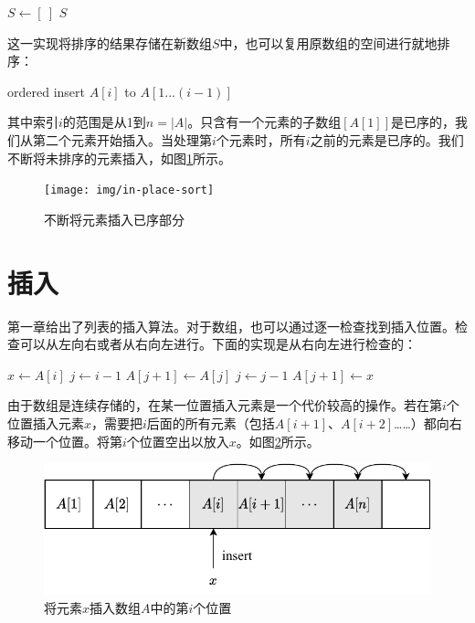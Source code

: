 \documentclass[b5paper]{ctexart}
\begin{document}
\begin{algorithmic}[1]
  \State $S \gets [\ ]$
    \State {}
  \EndFor
  \State \Return $S$
\EndFunction
\end{algorithmic}

这一实现将排序的结果存储在新数组$S$中，也可以复用原数组的空间进行就地排序：

\begin{algorithmic}[1]
    \State ordered insert $A[i]$ to $A[1...(i-1)]$
  \EndFor
\EndFunction
\end{algorithmic}

其中索引$i$的范围是从1到$n = |A|$。只含有一个元素的子数组$[A[1]]$是已序的，我们从第二个元素开始插入。当处理第$i$个元素时，所有$i$之前的元素是已序的。我们不断将未排序的元素插入，如图\ref{fig:in-place-isort}所示。

\begin{figure}[htbp]
  \centering
  \texttt{[image: img/in-place-sort]}
  \caption{不断将元素插入已序部分}
  \label{fig:in-place-isort}
\end{figure}

\section{插入}

第一章给出了列表的插入算法。对于数组，也可以通过逐一检查找到插入位置。检查可以从左向右或者从右向左进行。下面的实现是从右向左进行检查的：

\begin{algorithmic}[1]
    \State $x \gets A[i]$ 
    \State $j \gets i-1$
      \State $A[j+1] \gets A[j]$
      \State $j \gets j - 1$
    \EndWhile
    \State $A[j+1] \gets x$
  \EndFor
\EndFunction
\end{algorithmic}

由于数组是连续存储的，在某一位置插入元素是一个代价较高的操作。若在第$i$个位置插入元素$x$，需要把$i$后面的所有元素（包括$A[i+1]$、$A[i+2]$……）都向右移动一个位置。将第$i$个位置空出以放入$x$。如图\ref{fig:array-shift}所示。

\begin{figure}[htbp]
  \centering
  \includegraphics[scale=0.7]{img/array-shift}
  \caption{将元素$x$插入数组$A$中的第$i$个位置}
  \label{fig:array-shift}
\end{figure}
\end{document}
